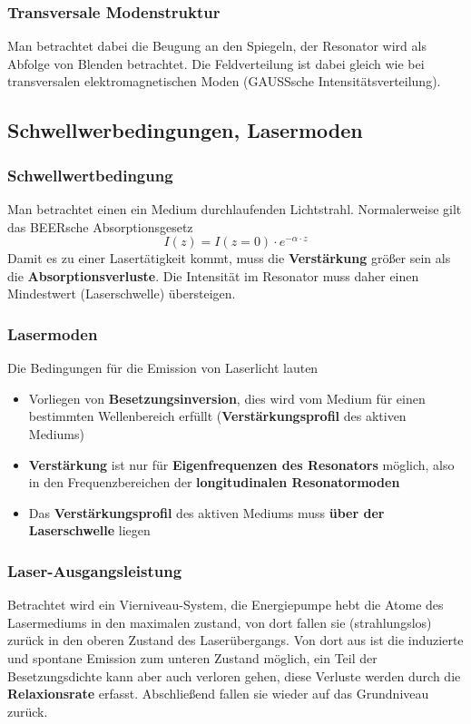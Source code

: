 \documentclass[12pt,a4paper,ngerman]{article}
\begin{document}
\subsubsection*{Transversale Modenstruktur}

Man betrachtet dabei die Beugung an den Spiegeln, der Resonator wird als Abfolge von Blenden betrachtet. Die Feldverteilung ist dabei gleich wie bei transversalen elektromagnetischen Moden (GAUSSsche Intensitätsverteilung). 

\pagebreak


\subsection{Schwellwerbedingungen, Lasermoden}

\subsubsection*{Schwellwertbedingung}
Man betrachtet einen ein Medium durchlaufenden Lichtstrahl. Normalerweise gilt das BEERsche Absorptionsgesetz
\begin{equation}
I(z) = I(z = 0)\cdot e^{-\alpha \cdot z}
\end{equation}
Damit es zu einer Lasertätigkeit kommt, muss die \textbf{Verstärkung} größer sein als die \textbf{Absorptionsverluste}. Die Intensität im Resonator muss daher einen Mindestwert (Laserschwelle) übersteigen. 

\subsubsection*{Lasermoden}
Die Bedingungen für die Emission von Laserlicht lauten
\begin{itemize}
\item Vorliegen von \textbf{Besetzungsinversion}, dies wird vom Medium für einen bestimmten Wellenbereich erfüllt (\textbf{Verstärkungsprofil} des aktiven Mediums)
\item \textbf{Verstärkung} ist nur für \textbf{Eigenfrequenzen des Resonators} möglich, also in den Frequenzbereichen der \textbf{longitudinalen Resonatormoden}
\item Das \textbf{Verstärkungsprofil} des aktiven Mediums muss \textbf{über der Laserschwelle} liegen 
\end{itemize}

\subsubsection*{Laser-Ausgangsleistung}
Betrachtet wird ein Vierniveau-System, die Energiepumpe hebt die Atome des Lasermediums in den maximalen zustand, von dort fallen sie (strahlungslos) zurück in den oberen Zustand des Laserübergangs. Von dort aus ist die induzierte und spontane Emission zum unteren Zustand möglich, ein Teil der Besetzungsdichte kann aber auch verloren gehen, diese Verluste werden durch die \textbf{Relaxionsrate} erfasst. Abschließend fallen sie wieder auf das Grundniveau zurück. 
\end{document}
